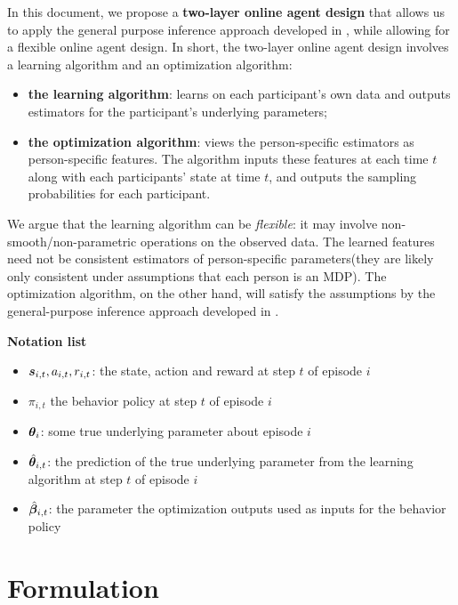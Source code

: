 \documentclass{article}
\begin{document}
In this document, we propose a \textbf{two-layer online agent design} that allows us to apply the general purpose inference approach developed in \cite{zhang2022statistical}, while allowing for a flexible online agent design. In short, the two-layer online agent design involves a learning algorithm and an optimization algorithm: 
\begin{itemize}
    \item \textbf{the learning algorithm}: learns on each participant's own data and outputs estimators for the participant's underlying parameters;
    \item \textbf{the optimization algorithm}: views the person-specific estimators as person-specific features. The algorithm inputs  these features at each time $t$ along with each participants' state at time $t$, and outputs the sampling probabilities for each participant.
\end{itemize}

We argue that the learning algorithm can be \textit{flexible}: it may involve non-smooth/non-parametric operations on the observed data. The learned features need not be consistent estimators of person-specific parameters(they are likely only consistent under assumptions that each person is an MDP). The optimization algorithm, on the other hand, will satisfy the assumptions  by the general-purpose inference approach developed in \cite{zhang2022statistical}.

\textbf{Notation list}
\begin{itemize}
    \item ${\bm{s}}_{i, t}, a_{i, t}, r_{i, t}$: the state, action and reward at step $t$ of episode $i$
    \item $\pi_{i, t}$ the behavior policy at step $t$ of episode $i$
    \item ${\bm{\theta}}_{i}$: some true underlying parameter about episode $i$
    \item $\hat {{\bm{\theta}}}_{i, t}$: the prediction of the true underlying parameter from the learning algorithm at step $t$ of episode $i$
    \item $\hat {{\bm{\beta}}}_{i, t}$: the parameter the optimization outputs used as inputs for the behavior policy
\end{itemize}

\section{Formulation}
\end{document}
